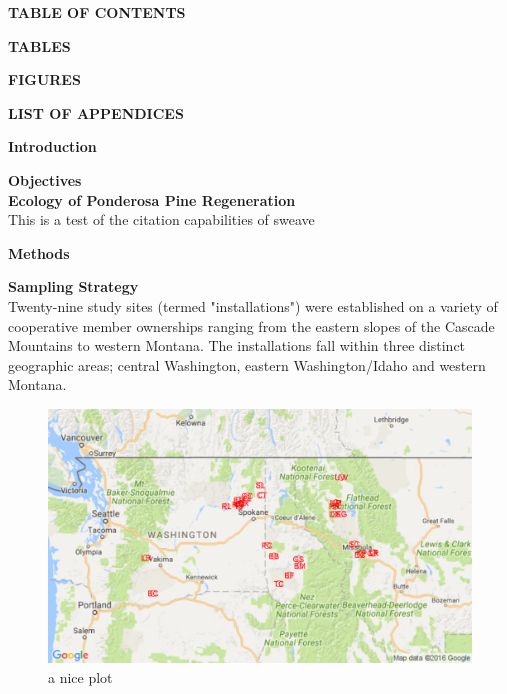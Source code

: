 \documentclass[10pt, letterpaper, fleqn]{article}
\begin{document}
\newpage
\large 
\begin{center}
\textbf{TABLE OF CONTENTS}\\[1pt]
\end{center}
\normalsize

\newpage
\large 
\begin{center}
\textbf{TABLES}\\[1pt]
\end{center}
\normalsize
\listoftables
\normalsize

\newpage
\large 
\begin{center}
\textbf{FIGURES}\\[1pt]
\end{center}
\normalsize
\listoffigures

\newpage
\large 
\begin{center}
\textbf{LIST OF APPENDICES}\\[1pt]
\end{center}
\normalsize

\newpage
\large 
\begin{center}
\textbf{Introduction}\\[1pt]
\end{center}
\normalsize
\noindent 
{}
\textbf{Objectives}\\[1pt]
\textbf{Ecology of Ponderosa Pine Regeneration}\\[1pt]
This is a test of the citation capabilities of sweave\cite{Riegel1995a}

\newpage
\large 
\begin{center}
\textbf{Methods}\\[1pt]
\end{center}
\normalsize
\textbf{Sampling Strategy}\\[1pt]
\doublespacing
Twenty-nine study sites (termed "installations") were established on a variety of cooperative member ownerships ranging from the eastern slopes of the Cascade Mountains to western Montana. The installations fall within three distinct geographic areas; central Washington, eastern Washington/Idaho and western Montana. \\[4pt]

\begin{figure}[h]
    \centering
    \includegraphics[width=\linewidth]{inst_map.png}
    \caption{a nice plot}
    \label{fig:mesh1}
\end{figure}
\end{document}
